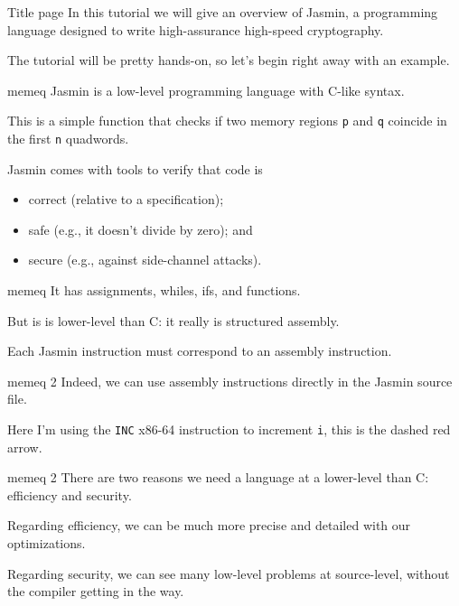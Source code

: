 \documentclass[
  xcolor={table,dvipsnames},
]{beamer}
\newcommand{\hint}[1]{{\color{Red}{[HINT: #1]}}}
\newcommand{\nextframe}{\hint{NEXT FRAME}}
\begin{document}
\begin{frame}{Title page}
  In this tutorial we will give an overview of Jasmin, a programming language
  designed to write high-assurance high-speed cryptography.

  \vfill

  The tutorial will be pretty hands-on, so let's begin right away with an
  example.

  \nextframe
\end{frame}

\begin{frame}{memeq}
  Jasmin is a low-level programming language with C-like syntax.

  \vfill

  This is a simple function that checks if two memory regions \texttt{p}
  and \texttt{q} coincide in the first \texttt{n} quadwords.

  \vfill

  Jasmin comes with tools to verify that code is
  \begin{itemize}
  \itemsep=1em
  \item[] correct (relative to a specification);
  \item[] safe (e.g., it doesn't divide by zero); and
  \item[] secure (e.g., against side-channel attacks).
  \end{itemize}
\end{frame}

\begin{frame}{memeq}
  It has assignments, whiles, ifs, and functions.

  \vfill

  But is is lower-level than C: it really is structured assembly.

  \vfill

  Each Jasmin instruction must correspond to an assembly instruction.

  \nextframe
\end{frame}

\begin{frame}{memeq 2}
  Indeed, we can use assembly instructions directly in the Jasmin source file.

  \nextframe

  \vfill

  Here I'm using the \texttt{INC} x86-64 instruction to increment \texttt{i},
  this is the dashed red arrow.
\end{frame}

\begin{frame}{memeq 2}
  There are two reasons we need a language at a lower-level than C: efficiency
  and security.

  \vfill

  Regarding efficiency, we can be much more precise and detailed with our
  optimizations.

  \vfill

  Regarding security, we can see many low-level problems at source-level,
  without the compiler getting in the way.
\end{frame}
\end{document}
